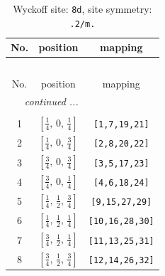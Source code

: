\documentclass[fleqn,8pt]{jsarticle}
\begin{document}
\begin{longtable}{ccc}
\caption{Wyckoff site: {\tt 8d}, site symmetry: {\tt .2/m.}}
 \\
 \hline \hline
No. & position & mapping \\ \hline \endfirsthead

\multicolumn{2}{l}{\tablename\ \thetable{}} \\
 \hline \hline
No. & position & mapping \\ \hline \endhead

 \hline \hline
\multicolumn{2}{r}{\footnotesize\it continued ...} \\ \endfoot

 \hline \hline
\multicolumn{2}{r}{} \\ \endlastfoot

1 & $\left[ \frac{1}{4},\, 0,\, \frac{1}{4} \right]$ & {\tt [1,7,19,21]} \\ \hline
2 & $\left[ \frac{1}{4},\, 0,\, \frac{3}{4} \right]$ & {\tt [2,8,20,22]} \\ \hline
3 & $\left[ \frac{3}{4},\, 0,\, \frac{3}{4} \right]$ & {\tt [3,5,17,23]} \\ \hline
4 & $\left[ \frac{3}{4},\, 0,\, \frac{1}{4} \right]$ & {\tt [4,6,18,24]} \\ \hline
5 & $\left[ \frac{1}{4},\, \frac{1}{2},\, \frac{3}{4} \right]$ & {\tt [9,15,27,29]} \\ \hline
6 & $\left[ \frac{1}{4},\, \frac{1}{2},\, \frac{1}{4} \right]$ & {\tt [10,16,28,30]} \\ \hline
7 & $\left[ \frac{3}{4},\, \frac{1}{2},\, \frac{1}{4} \right]$ & {\tt [11,13,25,31]} \\ \hline
8 & $\left[ \frac{3}{4},\, \frac{1}{2},\, \frac{3}{4} \right]$ & {\tt [12,14,26,32]} \\
\end{longtable}
\renewcommand{\arraystretch}{1.2}
\end{document}
